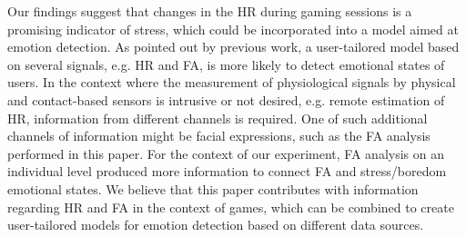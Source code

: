 Our findings suggest that changes in the HR during gaming sessions is a promising indicator of stress, which could be incorporated into a model aimed at emotion detection. As pointed out by previous work, a user-tailored model based on several signals, e.g. HR and FA, is more likely to detect emotional states of users. In the context where the measurement of physiological signals by physical and contact-based sensors is intrusive or not desired, e.g. remote estimation of HR, information from different channels is required. One of such additional channels of information might be facial expressions, such as the FA analysis performed in this paper. For the context of our experiment, FA analysis on an individual level produced more information to connect FA and stress/boredom emotional states. We believe that this paper contributes with information regarding HR and FA in the context of games, which can be combined to create user-tailored models for emotion detection based on different data sources.

